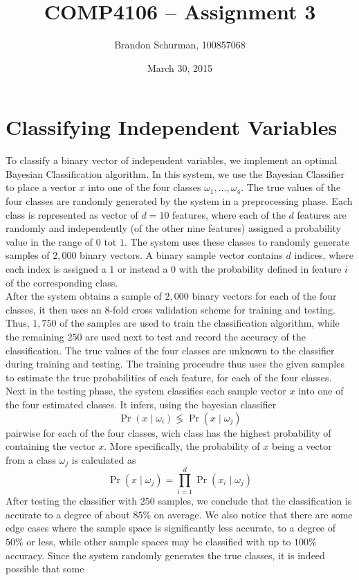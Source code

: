 \documentclass[11pt,english]{article}
\begin{document}
\title{\bf COMP4106 -- Assignment 3}
\author{Brandon Schurman, 100857068}
\date{March 30, 2015}
\maketitle


\section{Classifying Independent Variables}
To classify a binary vector of independent variables, we implement an optimal Bayesian Classification algorithm. 
In this system, we use the Bayesian Classifier to place a vector $x$ into one of the four classes $\omega_1, ..., \omega_4$.
The true values of the four classes are randomly generated by the system in a preprocessing phase. 
Each class is represented as vector of $d=10$
features, where each of the $d$ features are randomly and independently (of the other nine
features) assigned a probability 
value in the range of $0$ tot $1$. 
The system uses these classes to randomly generate samples of $2,000$ binary vectors. A
binary sample vector contains $d$ indices, 
where each index is assigned a $1$ or instead a $0$ with the probability defined in feature $i$ of the corresponding class.
\vspace{2mm}\\
After the system obtains a sample of $2,000$ binary vectors for each of the four classes, it then uses an 8-fold cross validation scheme 
for training and testing. Thus, $1,750$ of the samples are used to train the classification algorithm, while the remaining $250$ are used
next to test and record the accuracy of the classification. The true values of the four classes are unknown to the classifier during 
training and testing.
The training proceudre thus uses the given samples to estimate the true probabilities of each feature, for each of the four classes.
Next in the testing phase, the system classifies each sample vector $x$ into one of the
four estimated classes. It infers, using the bayesian classifier
$$\Pr(x\mid\omega_i)\lessgtr\Pr(x\mid\omega_j)$$ pairwise for each of the four classes, wich class has the highest probability of containing the vector $x$. More specifically, the
probability of $x$ being a vector from a class $\omega_j$ is calculated as
$$\Pr(x\mid\omega_j) = \prod_{i=1}^{d}\Pr(x_i\mid\omega_j)$$
After testing the classifier with $250$ samples, we conclude that the classification is accurate to a degree of about $85\%$ on average. 
We also notice that there are some edge cases where the sample space is significantly less accurate, to a degree of $50\%$ or less, while other sample spaces may be classified with up to $100\%$ accuracy. Since the system randomly generates the true classes, it is indeed possible that some 
\end{document}
